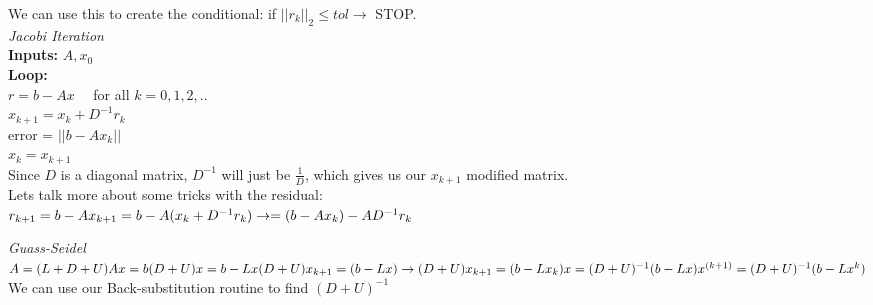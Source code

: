 \documentclass[10pt, AMS Euler]{article}
\begin{document}
We can use this to create the conditional: if $||r_k||_2 \leq tol \rightarrow$ STOP.\\

\textit{Jacobi Iteration}\\

\textbf{Inputs:} $A, x_0$\\

\textbf{Loop:}\\
$r = b - Ax \quad$ for all $k = 0,1,2,..$\\
$x_{k+1} = x_k + D^{-1} r_k$\\
error = $|| b - Ax_k||$\\
$x_k = x_{k + 1}$\\

Since $D$ is a diagonal matrix, $D^{-1}$ will just be $\frac{1}{D}$, which gives us our $x_{k+1}$ modified matrix.\\

Lets talk more about some tricks with the residual:\\
$
r_{k+1} = b - Ax_{k+1} = b - A(x_k + D^{-1}r_k)\\
\rightarrow = (b - Ax_k) - AD^{-1}r_k\\
$

\textit{Guass-Seidel}\\

$
A = (L + D + U)\\
Ax = b\\
(D + U)x = b - Lx\\
(D + U)x_{k+1} = (b - Lx)\rightarrow (D + U)x_{k + 1} = (b - Lx_k)\\
x = (D + U)^{-1} (b - Lx) \\
x^{(k + 1)} = (D + U)^{-1} (b - Lx^k)\\
$\\

We can use our Back-substitution routine to find $(D + U)^{-1}$\\



\noindent \underline{\hspace{3in}}\\
\end{document}
